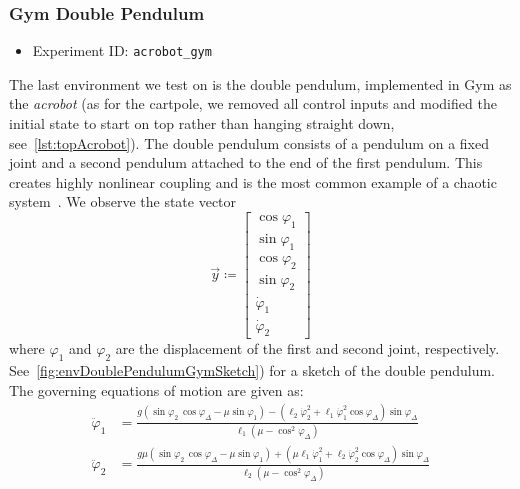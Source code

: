		\subsubsection{Gym Double Pendulum}
			\label{subsubsec:doublePendulum}

			\begin{itemize}
				\item Experiment ID: \texttt{acrobot\_gym}
			\end{itemize}

			The last environment we test on is the double pendulum, implemented in Gym as the \emph{acrobot} (as for the cartpole, we removed all control inputs and modified the initial state to start on top rather than hanging straight down, see~\autoref{lst:topAcrobot}). The double pendulum consists of a pendulum on a fixed joint and a second pendulum attached to the end of the first pendulum. This creates highly nonlinear coupling and is the most common example of a chaotic system~\cite{shinbrotChaosDoublePendulum1992}. We observe the state vector
			\begin{equation*}
				\vec{y} \coloneqq
					\begin{bmatrix}
						\cos\varphi_1 \\
						\sin\varphi_1 \\
						\cos\varphi_2 \\
						\sin\varphi_2 \\
						\dot{\varphi}_1 \\
						\dot{\varphi}_2
					\end{bmatrix}
			\end{equation*}
			where \(\varphi_1\) and \(\varphi_2\) are the displacement of the first and second joint, respectively. See~\autoref{fig:envDoublePendulumGymSketch}) for a sketch of the double pendulum. The governing equations of motion are given as:
			\begin{align*}
				\ddot{\varphi}_1 &= \frac{g (\sin\varphi_2 \, \cos\varphi_\Delta - \mu \sin\varphi_1) - (\ell_2 \dot{\varphi}_2^2 + \ell_1 \dot{\varphi}_1^2 \cos\varphi_\Delta) \sin\varphi_\Delta}{\ell_1 (\mu - \cos^2\varphi_\Delta)} \\
				\ddot{\varphi}_2 &= \frac{g \mu (\sin\varphi_2 \, \cos\varphi_\Delta - \mu \sin\varphi_1) + (\mu \ell_1 \dot{\varphi}_1^2 + \ell_2 \dot{\varphi}_2^2 \cos\varphi_\Delta) \sin\varphi_\Delta}{\ell_2 (\mu - \cos^2\varphi_\Delta)}
			\end{align*}
